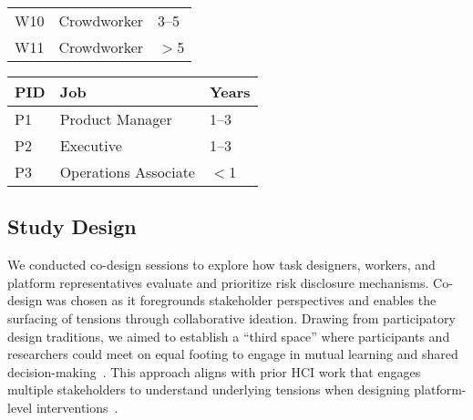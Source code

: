 \begin{table*}
\begin{minipage}[b]{0.32\textwidth}
\begin{tabular}{lll}
W10 & Crowdworker & 3--5 \\
W11 & Crowdworker & $>$5 \\
\bottomrule
\end{tabular}
\caption{Worker Participants}
\label{tab:workers}
\end{minipage}
\hfill
\begin{minipage}[b]{0.32\textwidth}
\centering
\begin{tabular}{lll}
\toprule
\textbf{PID} & \textbf{Job} & \textbf{Years} \\
\midrule
P1 & Product Manager & 1--3 \\
P2 & Executive & 1--3 \\
P3 & Operations Associate & $<$1 \\
\bottomrule
\end{tabular}
\caption{Platform Representatives}
\end{minipage}
\end{table*}
\label{tab:platform-reps}



\subsection{Study Design}
We conducted co-design sessions to explore how task designers, workers, and platform representatives evaluate and prioritize risk disclosure mechanisms. Co-design was chosen as it foregrounds stakeholder perspectives and enables the surfacing of tensions through collaborative ideation. Drawing from participatory design traditions, we aimed to establish a ``third space'' where participants and researchers could meet on equal footing to engage in mutual learning and shared decision-making~\cite{muller_participatory_nodate, steen2013co, bodker_participatory_2018}. This approach aligns with prior HCI work that engages multiple stakeholders to understand underlying tensions when designing platform-level interventions~\cite{hsieh_designing_2023, tang2024ai}.

